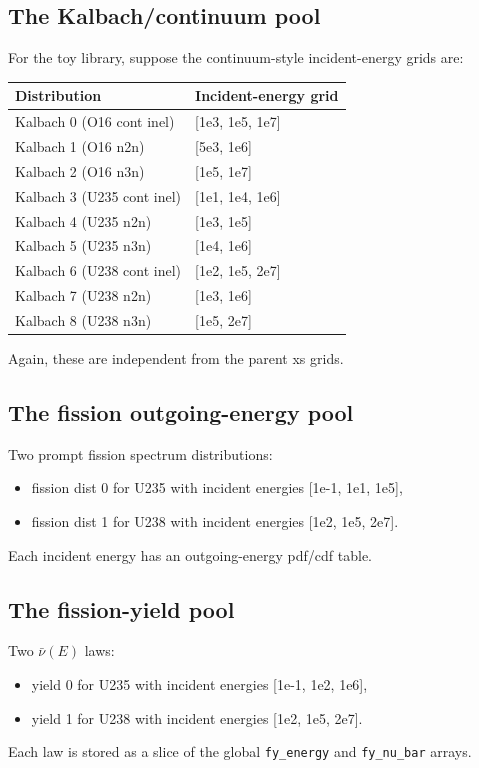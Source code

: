 \documentclass[11pt,a4paper]{article}
\begin{document}
\subsection{The Kalbach/continuum pool}
For the toy library, suppose the continuum-style incident-energy grids are:
\begin{longtable}{p{4.5cm} p{7.0cm}}
\toprule
Distribution & Incident-energy grid \\
\midrule
Kalbach 0 (O16 cont inel) & [1e3, 1e5, 1e7] \\
Kalbach 1 (O16 n2n) & [5e3, 1e6] \\
Kalbach 2 (O16 n3n) & [1e5, 1e7] \\
Kalbach 3 (U235 cont inel) & [1e1, 1e4, 1e6] \\
Kalbach 4 (U235 n2n) & [1e3, 1e5] \\
Kalbach 5 (U235 n3n) & [1e4, 1e6] \\
Kalbach 6 (U238 cont inel) & [1e2, 1e5, 2e7] \\
Kalbach 7 (U238 n2n) & [1e3, 1e6] \\
Kalbach 8 (U238 n3n) & [1e5, 2e7] \\
\bottomrule
\end{longtable}
Again, these are independent from the parent xs grids.

\subsection{The fission outgoing-energy pool}
Two prompt fission spectrum distributions:
\begin{itemize}[leftmargin=1.4em]
  \item fission dist 0 for U235 with incident energies [1e-1, 1e1, 1e5],
  \item fission dist 1 for U238 with incident energies [1e2, 1e5, 2e7].
\end{itemize}
Each incident energy has an outgoing-energy pdf/cdf table.

\subsection{The fission-yield pool}
Two $\bar\nu(E)$ laws:
\begin{itemize}[leftmargin=1.4em]
  \item yield 0 for U235 with incident energies [1e-1, 1e2, 1e6],
  \item yield 1 for U238 with incident energies [1e2, 1e5, 2e7].
\end{itemize}
Each law is stored as a slice of the global \texttt{fy\_energy} and \texttt{fy\_nu\_bar} arrays.
\end{document}
